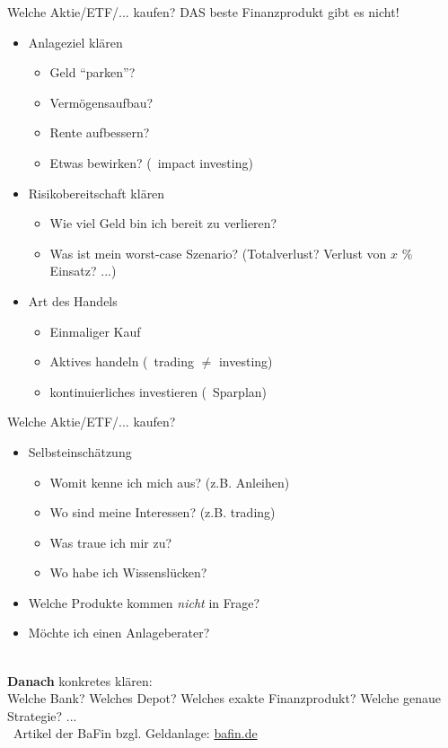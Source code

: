 \documentclass{beamer}
\newcommand{\n}{\hfill\\\vspace{0.25cm}}
\begin{document}
			\begin{frame}{Welche Aktie/ETF/... kaufen?}
				DAS beste Finanzprodukt gibt es nicht!\pause
				\begin{itemize}
					\item Anlageziel klären
					\begin{itemize}
						\item Geld "`parken"'?
						\item Vermögensaufbau?
						\item Rente aufbessern?
						\item Etwas bewirken? (\textrightarrow\ impact investing)
					\end{itemize}\pause
					\item Risikobereitschaft klären
					\begin{itemize}
						\item Wie viel Geld bin ich bereit zu verlieren?
						\item Was ist mein worst-case Szenario? (Totalverlust? Verlust von $x$ \% Einsatz? ...)
					\end{itemize}\pause
					\item Art des Handels
					\begin{itemize}
						\item Einmaliger Kauf
						\item Aktives handeln (\textrightarrow\ trading $\neq$ investing)
						\item kontinuierliches investieren (\textrightarrow\ Sparplan)
					\end{itemize}
				\end{itemize}
			\end{frame}
		
			\begin{frame}{Welche Aktie/ETF/... kaufen?}
				\begin{itemize}
					\item Selbsteinschätzung
					\begin{itemize}
						\item Womit kenne ich mich aus? (z.B. Anleihen)
						\item Wo sind meine Interessen? (z.B. trading)
						\item Was traue ich mir zu?
						\item Wo habe ich Wissenslücken?
					\end{itemize}\pause
					\item Welche Produkte kommen \textit{nicht} in Frage? \pause
					\item Möchte ich einen Anlageberater? \pause
				\end{itemize}\n
				\textbf{Danach} konkretes klären:\\
				Welche Bank? Welches Depot? Welches exakte Finanzprodukt? Welche genaue Strategie? ...\n
				\textrightarrow\ Artikel der BaFin bzgl. Geldanlage: \href{https://www.bafin.de/SharedDocs/Veroeffentlichungen/DE/Fachartikel/2015/fa_bj_1506_geldanlage.html}{bafin.de}
			\end{frame}
	
\end{document}

